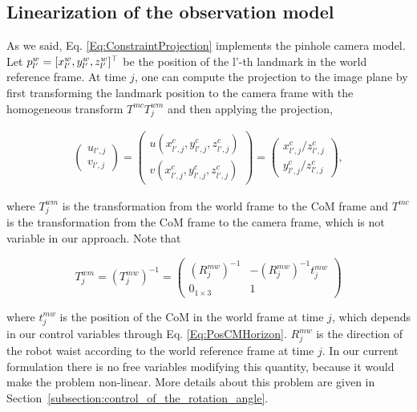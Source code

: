 \subsection{Linearization of the observation model}

As we said, Eq. \ref{Eq:ConstraintProjection} implements the pinhole camera model. Let $p^{w}_{l'} = [x^{w}_{l'},y^{w}_{l'},z^{w}_{l'}]^{\top}$ be the position of the {l'}-th landmark in the world reference frame. At time $j$, one can compute the projection to the image plane by first transforming the landmark position to the camera frame with the homogeneous transform $T^{mc} T^{wm}_j$ and then applying the projection,

\begin{equation}
\label{Eq:Projection}
\begin{array}{c}
 \left(
 \begin{matrix}
  u_{l',j} \\
  v_{l',j}
\end{matrix}
\right)
  =
 \left(
 \begin{matrix}
  u(x^{c}_{l',j},y^{c}_{l',j},z^{c}_{l',j}) \\
  v(x^{c}_{l',j},y^{c}_{l',j},z^{c}_{l',j})
 \end{matrix}
 \right)
 =  \left(
 \begin{matrix}
  x^{c}_{l',j} / z^{c}_{l',j}\\
  y^{c}_{l',j} / z^{c}_{l',j}
 \end{matrix}
 \right),
 \end{array}
\end{equation}

where $T^{wm}_j$ is the transformation from the world frame to the CoM frame and $T^{mc}$ is the transformation from the CoM frame to the camera frame, which is not variable in our approach. Note that

{\small
$$
T^{wm}_j = (T^{mw}_j)^{-1} = 
\left(
\begin{matrix}
(R^{mw}_j)^{-1} & -(R^{mw}_j)^{-1}t^{mw}_j \\
0_{1 \times 3} & 1
\end{matrix}
\right)
$$ 
}

where $t^{mw}_j$ is the position of the CoM in the world frame at time $j$, which depends in our control variables through Eq. \ref{Eq:PosCMHorizon}.
$R^{mw}_j$ is the direction of the robot waist according to the world reference frame at time $j$. In our current formulation 
there is no free variables modifying this quantity, because it would make the problem non-linear. More details
about this problem are given in Section~\ref{subsection:control_of_the_rotation_angle}.

